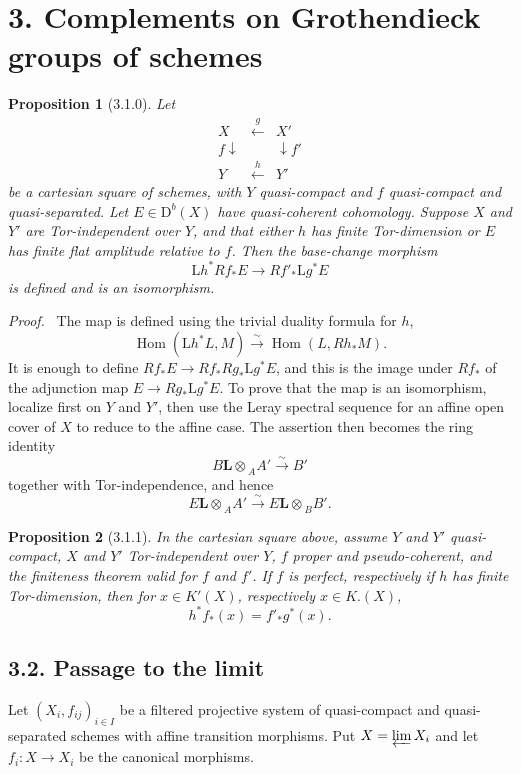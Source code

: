\documentclass[13pt]{extarticle}
\newcommand{\D}{\mathrm D}
\newcommand{\Hom}{\operatorname{Hom}}
\newcommand{\Ltens}{\mathbin{\mathbf L\!\otimes}}
\newcommand{\iso}{\xrightarrow{\sim}}
\newenvironment{prooftext}[1][Proof]{\par\noindent\emph{#1.}\ }{\par\medskip}
\newtheorem*{proposition*}{Proposition}
\begin{document}
\section*{3. Complements on Grothendieck groups of schemes}

\begin{proposition*}[3.1.0]
Let
\[
\begin{array}{ccc}
X & \xleftarrow{g} & X'\\
f\downarrow && \downarrow f'\\
Y & \xleftarrow{h} & Y'
\end{array}
\]
be a cartesian square of schemes, with $Y$ quasi-compact and $f$ quasi-compact and quasi-separated. Let $E\in\D^b(X)$ have quasi-coherent cohomology. Suppose $X$ and $Y'$ are Tor-independent over $Y$, and that either $h$ has finite Tor-dimension or $E$ has finite flat amplitude relative to $f$. Then the base-change morphism
\[
\mathrm Lh^*Rf_*E\longrightarrow Rf'_*\mathrm Lg^*E
\]
is defined and is an isomorphism.
\end{proposition*}

\begin{prooftext}
The map is defined using the trivial duality formula for $h$,
\[
\Hom(\mathrm Lh^*L,M)\iso\Hom(L,Rh_*M).
\]
It is enough to define $Rf_*E\to Rf_*Rg_*\mathrm Lg^*E$, and this is the image under $Rf_*$ of the adjunction map $E\to Rg_*\mathrm Lg^*E$. To prove that the map is an isomorphism, localize first on $Y$ and $Y'$, then use the Leray spectral sequence for an affine open cover of $X$ to reduce to the affine case. The assertion then becomes the ring identity
\[
B\Ltens_A A'\iso B'
\]
together with Tor-independence, and hence
\[
E\Ltens_A A'\iso E\Ltens_B B'.
\]
\end{prooftext}

\begin{proposition*}[3.1.1]
In the cartesian square above, assume $Y$ and $Y'$ quasi-compact, $X$ and $Y'$ Tor-independent over $Y$, $f$ proper and pseudo-coherent, and the finiteness theorem valid for $f$ and $f'$. If $f$ is perfect, respectively if $h$ has finite Tor-dimension, then for $x\in K'(X)$, respectively $x\in K.(X)$,
\[
h^*f_*(x)=f'_*g^*(x).
\]
\end{proposition*}

\subsection*{3.2. Passage to the limit}
Let $(X_i,f_{ij})_{i\in I}$ be a filtered projective system of quasi-compact and quasi-separated schemes with affine transition morphisms. Put $X=\varprojlim X_i$ and let $f_i:X\to X_i$ be the canonical morphisms.
\end{document}
